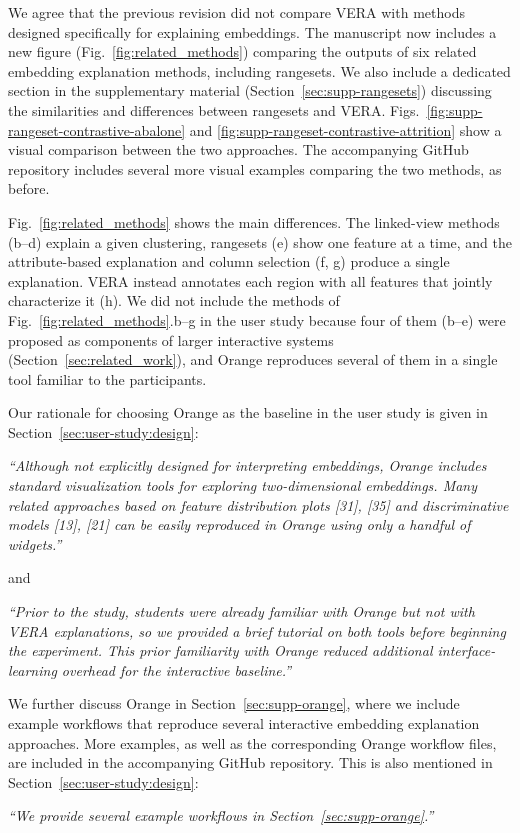 \documentclass[11pt]{article}
\newcommand{\answer}[1]{\noindent #1\par\vspace{2mm}}
\newcommand{\copyquote}[1]{\vspace{1mm} {\itshape ``#1''}\vspace{1mm}}
\begin{document}
\answer{%
We agree that the previous revision did not compare VERA with methods designed specifically for explaining embeddings. The manuscript now includes a new figure (Fig.~\ref{fig:related_methods}) comparing the outputs of six related embedding explanation methods, including rangesets. We also include a dedicated section in the supplementary material (Section~\ref{sec:supp-rangesets}) discussing the similarities and differences between rangesets and VERA. Figs.~\ref{fig:supp-rangeset-contrastive-abalone} and \ref{fig:supp-rangeset-contrastive-attrition} show a visual comparison between the two approaches. The accompanying GitHub repository includes several more visual examples comparing the two methods, as before.

Fig.~\ref{fig:related_methods} shows the main differences. The linked-view methods (b--d) explain a given clustering, rangesets (e) show one feature at a time, and the attribute-based explanation and column selection (f, g) produce a single explanation. VERA instead annotates each region with all features that jointly characterize it (h). We did not include the methods of Fig.~\ref{fig:related_methods}.b--g in the user study because four of them (b--e) were proposed as components of larger interactive systems (Section~\ref{sec:related_work}), and Orange reproduces several of them in a single tool familiar to the participants.

Our rationale for choosing Orange as the baseline in the user study is given in Section~\ref{sec:user-study:design}:

\copyquote{Although not explicitly designed for interpreting embeddings, Orange includes standard visualization tools for exploring two-dimensional embeddings. Many related approaches based on feature distribution plots [31], [35] and discriminative models [13], [21] can be easily reproduced in Orange using only a handful of widgets.}

and

\copyquote{Prior to the study, students were already familiar with Orange but not with VERA explanations, so we provided a brief tutorial on both tools before beginning the experiment. This prior familiarity with Orange reduced additional interface-learning overhead for the interactive baseline.}

We further discuss Orange in Section~\ref{sec:supp-orange}, where we include example workflows that reproduce several interactive embedding explanation approaches. More examples, as well as the corresponding Orange workflow files, are included in the accompanying GitHub repository. This is also mentioned in Section~\ref{sec:user-study:design}:

\copyquote{We provide several example workflows in Section~\ref{sec:supp-orange}.}
}
\end{document}

